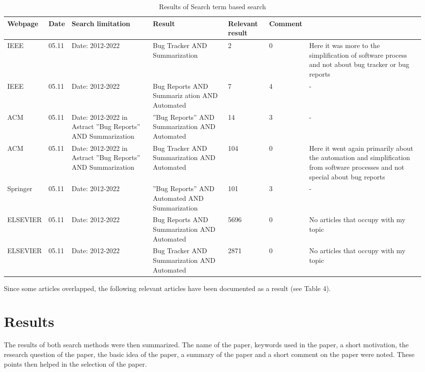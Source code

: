 \documentclass[a4paper,10pt, bibliography=totocnumbered]{scrreprt}
\begin{document}
\begin{table}
\begin{tabular}[h]{p{1cm}|p{1cm}|p{2cm}|p{2cm}|p{1cm}|p{1cm}|p{3cm}}
Webpage & Date & Search limitation & Result & Relevant result & Comment \\
\hline
IEEE & 05.11 & Date: 2012-2022 & Bug Tracker AND Summarization & 2 & 0 & Here it was more to the simplification of software process and not about bug tracker or bug reports  \\
\hline
IEEE & 05.11 & Date: 2012-2022 & Bug Reports AND Summariz ation AND Automated & 7 & 4 & - \\
\hline
ACM & 05.11 & Date: 2012-2022 in Astract ''Bug Reports'' AND Summarization &  ''Bug Reports'' AND Summarization AND Automated & 14 & 3 & - \\
\hline
ACM & 05.11 & Date: 2012-2022 in Astract ''Bug Reports'' AND Summarization &  Bug Tracker AND Summarization AND Automated & 104 & 0 & Here it went again primarily about the automation and simplification from software processes and not special about bug reports\\
\hline
Springer & 05.11 & Date: 2012-2022 &  ''Bug Reports'' AND Automated AND Summarization & 101 & 3 & -\\
\hline
ELSEVIER & 05.11 & Date: 2012-2022 &  Bug Reports AND Summarization AND Automated & 5696 & 0 & No articles that occupy
with my topic\\
\hline
ELSEVIER & 05.11 & Date: 2012-2022 &  Bug Tracker AND Summarization AND Automated & 2871 & 0 & No articles that occupy
with my topic\\
\end{tabular}
\caption{Results of Search term based search}
\label{tab:searchterm}
\end{table}


Since some articles overlapped, the following relevant articles have been documented as a result (see Table 4).
\section{Results}
The results of both search methods were then summarized. The name of the paper, keywords used in the paper, a short motivation, the research question of the paper, the basic idea of the paper, a summary of the paper and a short comment on the paper were noted. These points then helped in the selection of the paper.
\linebreak
\end{document}
